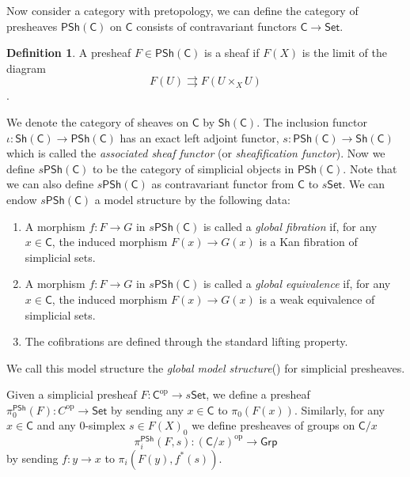 \documentclass[12pt]{amsart}
\theoremstyle{definition}
\newtheorem{defn}[thm]{Definition}
\theoremstyle{remark}
\numberwithin{equation}{section}
\newcommand{\CC}{{\mathsf C}}
\newcommand{\1}{{\mathbb{1}}}
\newcommand{\op}{\operatorname{op}}
\newcommand{\set}{\mathsf{Set}}
\newcommand{\gp}{\mathsf{Grp}}
\newcommand{\sh}{\mathsf{Sh}}
\newcommand{\psh}{\mathsf{PSh}}
\begin{document}
	
Now consider a category with pretopology, we can define the category of presheaves $\psh(\CC)$ on $\CC$ consists of contravariant functors $\CC \to \set$. 
\begin{defn}
       A presheaf $F \in \psh(\CC)$ is a sheaf if $F(X)$ is the limit of the diagram
    $$ F(U)\rightrightarrows F(U\times_X U)$$.
\end{defn}
We denote the category of sheaves on $\CC$ by $\sh(\CC)$. The inclusion functor $\iota: \sh(\CC)\to \psh(\CC)$ has an exact left adjoint functor, $s:\psh(\CC) \to \sh(\CC)$ which is called the {\it associated sheaf functor} (or {\it sheafification functor}).
Now we define $s\psh(\CC)$ to be the category of simplicial objects in $\psh(\CC)$. Note that we can also define $s\psh(\CC)$ as contravariant functor from $\CC$ to $s\set$. We can endow $s\psh(\CC)$ a model structure by the following data:
\begin{enumerate}
    \item A morphism $f:F \to G$ in $s\psh(\CC)$ is called a {\it global fibration}{} if, for any $x\in \CC$, the induced morphism $F(x)\to G(x)$ is a Kan fibration of simplicial sets.
    \item A morphism $f:F \to G$ in $s\psh(\CC)$ is called a {\it global equivalence}{} if, for any $x\in \CC$, the induced morphism $F(x)\to G(x)$ is a weak equivalence of simplicial sets.
    \item The cofibrations are defined through the standard lifting property.
\end{enumerate}
We call this model structure the {\it global model structure}{}(\cite{Jar87}) for simplicial presheaves.

Given a simplicial presheaf $F:\CC^{\op} \to s\set$, we define a presheaf $\pi^{\psh}_0(F):C^{\op} \to \set$ by sending any $x\in \CC$ to $\pi_0(F(x))$. Similarly, for any $x\in \CC$ and any 0-simplex $s\in F(X)_0$ we define presheaves of groups on $\CC/x$
$$
\pi^{\psh}_i(F, s): (\CC/x)^{\op} \to \gp
$$
by sending $f:y\to x$ to $\pi_i(F(y), f^*(s))$.
\end{document}
